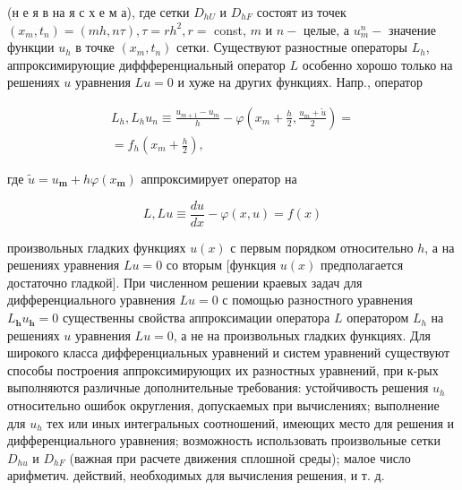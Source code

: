 \documentclass[10pt]{article}
\begin{document}
(н е я в на я с х е м а), где сетки $D_{h U}$ и $D_{h F}$ состоят из точек $\left(x_{m}, t_{n}\right)=(m h, n \tau), \tau=r h^{2}, r=$ const, $m$ и $n-$ целые, а $u_{m}^{n}-$ значение функции $u_{h}$ в точке $\left(x_{m}, t_{n}\right)$ сетки. Существуют разностные операторы $L_{h}$, аппроксимирующие диффференциальный оператор $L$ особенно хорошо только на решениях $u$ уравнения $L u=0$ и хуже на других функциях. Напр., оператор



\[

\begin{gathered}

L_{h}, L_{h} u_{n} \equiv \frac{u_{m+1}-u_{m}}{h}-\varphi\left(x_{m}+\frac{h}{2}, \frac{u_{m}+\tilde{u}}{2}\right)= \\

=f_{h}\left(x_{m}+\frac{h}{2}\right),

\end{gathered}

\]



где $\tilde{u}=u_{\boldsymbol{m}}+h \varphi\left(x_{\boldsymbol{m}}\right)$ аппроксимирует оператор на



\[

L, L u \equiv \frac{d u}{d x}-\varphi(x, u)=f(x)

\]



произвольных гладких функциях $u(x)$ с первым порядком относительно $h$, а на решениях уравнения $L u=0$ со вторым [функция $u(x)$ предполагается достаточно гладкой]. При численном решении краевых задач для дифференциального уравнения $L u=0$ с помощью разностного уравнения $L_{\boldsymbol{h}} u_{\boldsymbol{h}}=0$ существенны свойства аппроксимации оператора $L$ оператором $L_{h}$ на решениях $u$ уравнения $L u=0$, а не на произвольных гладких функциях. Для широкого класса дифференциальных уравнений и систем уравнений существуют способы построения аппроксимирующих их разностных уравнений, при к-рых выполняются различные дополнительные требования: устойчивость решения $u_{h}$ относительно ошибок округления, допускаемых при вычислениях; выполнение для $u_{h}$ тех или иных интегральных соотношений, имеющих место для решения $и$ дифференциального уравнения; возможность использовать произвольные сетки $D_{h u}$ и $D_{h F}$ (важная при расчете движения сплошной среды); малое число арифметич. действий, необходимых для вычисления решения, и т. д.
\end{document}

